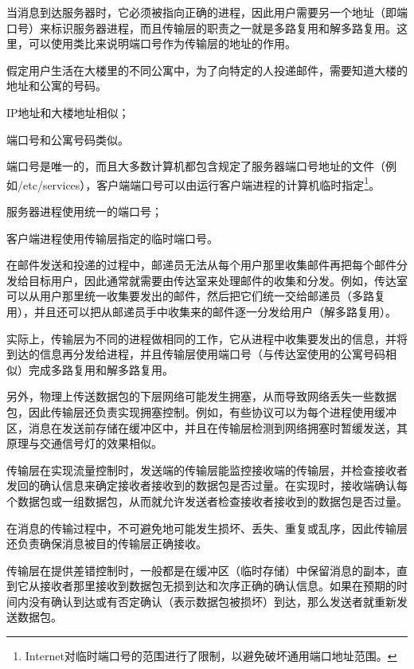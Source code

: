 当消息到达服务器时，它必须被指向正确的进程，因此用户需要另一个地址（即端口号）来标识服务器进程，而且传输层的职责之一就是多路复用和解多路复用。这里，可以使用类比来说明端口号作为传输层的地址的作用。

假定用户生活在大楼里的不同公寓中，为了向特定的人投递邮件，需要知道大楼的地址和公寓的号码。

\begin{compactitem}
\item IP地址和大楼地址相似；
\item 端口号和公寓号码类似。
\end{compactitem}


端口号是唯一的，而且大多数计算机都包含规定了服务器端口号地址的文件（例如/etc/services），客户端端口号可以由运行客户端进程的计算机临时指定\footnote{Internet对临时端口号的范围进行了限制，以避免破坏通用端口地址范围。}。

\begin{compactitem}
\item 服务器进程使用统一的端口号；
\item 客户端进程使用传输层指定的临时端口号。
\end{compactitem}



在邮件发送和投递的过程中，邮递员无法从每个用户那里收集邮件再把每个邮件分发给目标用户，因此通常就需要由传达室来处理邮件的收集和分发。例如，传达室可以从用户那里统一收集要发出的邮件，然后把它们统一交给邮递员（多路复用），并且还可以把从邮递员手中收集来的邮件逐一分发给用户（解多路复用）。

实际上，传输层为不同的进程做相同的工作，它从进程中收集要发出的信息，并将到达的信息再分发给进程，并且传输层使用端口号（与传达室使用的公寓号码相似）完成多路复用和解多路复用。



另外，物理上传送数据包的下层网络可能发生拥塞，从而导致网络丢失一些数据包，因此传输层还负责实现拥塞控制。例如，有些协议可以为每个进程使用缓冲区，消息在发送前存储在缓冲区中，并且在传输层检测到网络拥塞时暂缓发送，其原理与交通信号灯的效果相似。


传输层在实现流量控制时，发送端的传输层能监控接收端的传输层，并检查接收者发回的确认信息来确定接收者接收到的数据包是否过量。在实现时，接收端确认每个数据包或一组数据包，从而就允许发送者检查接收者接收到的数据包是否过量。

在消息的传输过程中，不可避免地可能发生损坏、丢失、重复或乱序，因此传输层还负责确保消息被目的传输层正确接收。

传输层在提供差错控制时，一般都是在缓冲区（临时存储）中保留消息的副本，直到它从接收者那里接收到数据包无损到达和次序正确的确认信息。如果在预期的时间内没有确认到达或有否定确认（表示数据包被损坏）到达，那么发送者就重新发送数据包。

